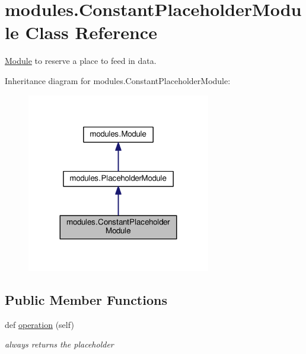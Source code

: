 \hypertarget{classmodules_1_1_constant_placeholder_module}{}\section{modules.\+Constant\+Placeholder\+Module Class Reference}
\label{classmodules_1_1_constant_placeholder_module}


\hyperlink{classmodules_1_1_module}{Module} to reserve a place to feed in data.  




Inheritance diagram for modules.\+Constant\+Placeholder\+Module\+:\nopagebreak
\begin{figure}[H]
\begin{center}
\leavevmode
\includegraphics[width=227pt]{classmodules_1_1_constant_placeholder_module__inherit__graph}
\end{center}
\end{figure}
\subsection*{Public Member Functions}
\begin{DoxyCompactItemize}
\item 
\mbox{\label{classmodules_1_1_constant_placeholder_module_a901989804cfa2399b0c2888127693589}} 
def \hyperlink{classmodules_1_1_constant_placeholder_module_a901989804cfa2399b0c2888127693589}{operation} (self)
\begin{DoxyCompactList}\small\item\em always returns the placeholder \end{DoxyCompactList}\end{DoxyCompactItemize}
